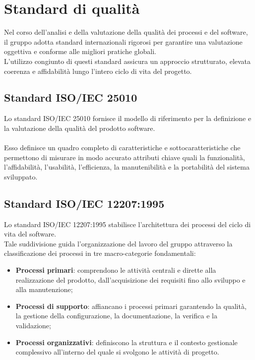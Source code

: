 \section{Standard di qualità}
Nel corso dell'analisi e della valutazione della qualità dei processi e del software, il gruppo adotta standard internazionali rigorosi per garantire una valutazione oggettiva e conforme alle migliori pratiche globali. \\
L'utilizzo congiunto di questi standard assicura un approccio strutturato, elevata coerenza e affidabilità lungo l'intero ciclo di vita del progetto.

\subsection{Standard ISO/IEC 25010}
Lo standard ISO/IEC 25010 fornisce il modello di riferimento per la definizione e la valutazione della qualità del prodotto software. \\
\\
Esso definisce un quadro completo di caratteristiche e sottocaratteristiche che permettono di misurare in modo accurato attributi chiave quali la funzionalità, l'affidabilità, l'usabilità, l'efficienza, la manutenibilità e la portabilità del sistema sviluppato.

\subsection{Standard ISO/IEC 12207:1995}
Lo standard ISO/IEC 12207:1995 stabilisce l'architettura dei processi del ciclo di vita del software.\\
Tale suddivisione guida l'organizzazione del lavoro del gruppo attraverso la classificazione dei processi in tre macro-categorie fondamentali:
\begin{itemize}
    \item \textbf{Processi primari}: comprendono le attività centrali e dirette alla realizzazione del prodotto, dall'acquisizione dei requisiti fino allo sviluppo e alla manutenzione;
    \item \textbf{Processi di supporto}: affiancano i processi primari garantendo la qualità, la gestione della configurazione, la documentazione, la verifica e la validazione;
    \item \textbf{Processi organizzativi}: definiscono la struttura e il contesto gestionale complessivo all'interno del quale si svolgono le attività di progetto.
\end{itemize}
